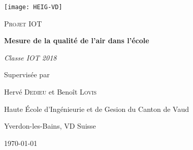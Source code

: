 \begin{titlepage}
	\centering
	\texttt{[image: HEIG-VD]}\par\vspace{2cm}
	{\scshape\Large Projet IOT\par}
	\vspace{1.5cm}
	{\huge\bfseries Mesure de la qualité de l'air dans l'école\par}
	\vspace{2cm}
	{\Large\itshape Classe IOT 2018\par}
    \vspace{2cm}
	{\large Supervisée par\par
	Hervé \textsc{Dedieu} et Benoît \textsc{Lovis}}
	\vfill
	Haute École d'Ingénieurie et de Gesion du Canton de Vaud\par
    Yverdon-les-Bains, VD Suisse\par
    \today
\end{titlepage}
\blankpage
